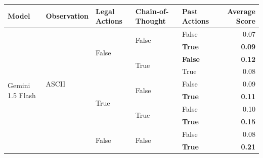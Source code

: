 \begin{tabular}{@{}lllllr@{}}
    \toprule
    \textbf{Model}                          & \textbf{Observation}              & \textbf{Legal Actions}    & \textbf{Chain-of-Thought} & \textbf{Past Actions} & \textbf{Average Score} \\
    \midrule
    \multirow[c]{28}{*}{Gemini 1.5 Flash}   & \multirow[c]{9}{*}{ASCII}         & \multirow[c]{4}{*}{False} & \multirow[c]{2}{*}{False} & False                 & 0.07 \\
                                            &                                   &                           &                           & \textbf{True}         & \textbf{0.09} \\
    \cmidrule{4-6}                  
                                            &                                   &                           & \multirow[c]{2}{*}{True}  & \textbf{False}        & \textbf{0.12} \\
                                            &                                   &                           &                           & True                  & 0.08 \\
    \cmidrule{3-6}                  
                                            &                                   & \multirow[c]{4}{*}{True}  & \multirow[c]{2}{*}{False} & False                 & 0.09 \\
                                            &                                   &                           &                           & \textbf{True}         & \textbf{0.11} \\
    \cmidrule{4-6}                  
                                            &                                   &                           & \multirow[c]{2}{*}{True}  & False                 & 0.10 \\
                                            &                                   &                           &                           & \textbf{True}         & \textbf{0.15} \\
    \cmidrule{2-6}              
                                            & \multirow[c]{9}{*}{Coordinates}   & \multirow[c]{4}{*}{False} & \multirow[c]{2}{*}{False} & False                 & 0.08 \\
                                            &                                   &                           &                           & \textbf{True}         & \textbf{0.21} \\

\end{tabular}
